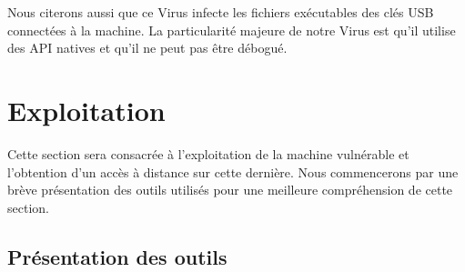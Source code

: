     Nous citerons aussi que ce Virus infecte les fichiers exécutables des clés USB connectées à la machine.
    La particularité majeure de notre Virus est qu’il utilise des API natives et qu’il ne peut pas être 
    débogué.

\section{Exploitation} \label{exploitation}
Cette section sera consacrée à l'exploitation de la machine vulnérable et l'obtention d'un accès à distance
sur cette dernière. Nous commencerons par une brève présentation des outils utilisés pour une meilleure compréhension
de cette section.
    \subsection{Présentation des outils}
